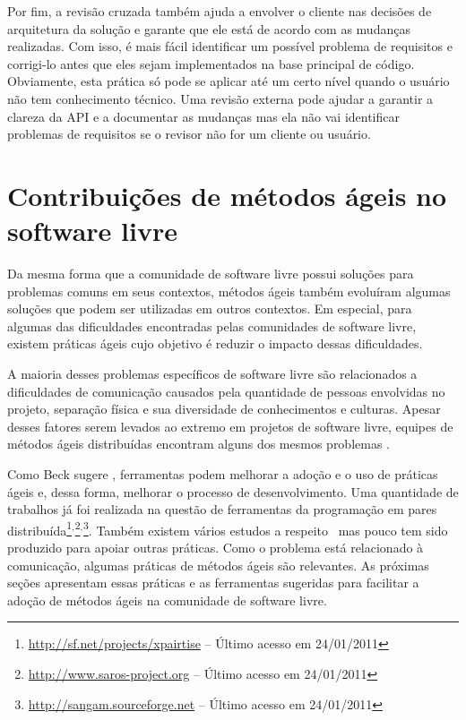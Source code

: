 Por fim, a revisão cruzada também ajuda a envolver o cliente nas
decisões de arquitetura da solução e garante que ele está de acordo
com as mudanças realizadas. Com isso, é mais fácil identificar um
possível problema de requisitos e corrigi-lo antes que eles sejam
implementados na base principal de código. Obviamente, esta prática só
pode se aplicar até um certo nível quando o usuário não tem
conhecimento técnico. Uma revisão externa pode ajudar a garantir a
clareza da API e a documentar as mudanças mas ela não vai identificar
problemas de requisitos se o revisor não for um cliente ou usuário.

\section{Contribuições de métodos ágeis no software livre}
\label{sec:agile-improve-os}

Da mesma forma que a comunidade de software livre possui soluções para
problemas comuns em seus contextos, métodos ágeis também evoluíram
algumas soluções que podem ser utilizadas em outros contextos. Em
especial, para algumas das dificuldades encontradas pelas comunidades
de software livre, existem práticas ágeis cujo objetivo é reduzir o
impacto dessas dificuldades.

A maioria desses problemas específicos de software livre são
relacionados a dificuldades de comunicação causados pela quantidade de
pessoas envolvidas no projeto, separação física e sua diversidade de
conhecimentos e culturas. Apesar desses fatores serem levados ao
extremo em projetos de software livre, equipes de métodos ágeis
distribuídas encontram alguns dos mesmos problemas
\cite{Sutherland2007,Maurer2002}.

Como Beck sugere \cite{Beck2008}, ferramentas podem melhorar a adoção
e o uso de práticas ágeis e, dessa forma, melhorar o processo de
desenvolvimento. Uma quantidade de trabalhos já foi
realizada na questão de ferramentas da programação em pares
distribuída\footnote{\url{http://sf.net/projects/xpairtise} -- Último
  acesso em
  24/01/2011}$^{,}$\footnote{\url{http://www.saros-project.org} --
  Último acesso em
  24/01/2011}$^{,}$\footnote{\url{http://sangam.sourceforge.net} --
  Último acesso em 24/01/2011}. Também existem vários estudos a
respeito~\cite{Nagappan2003} mas pouco tem sido produzido para apoiar
outras práticas. Como o problema está relacionado à comunicação,
algumas práticas de métodos ágeis são relevantes. As próximas
seções apresentam essas práticas e as ferramentas sugeridas
para facilitar a adoção de métodos ágeis na comunidade de software
livre.

